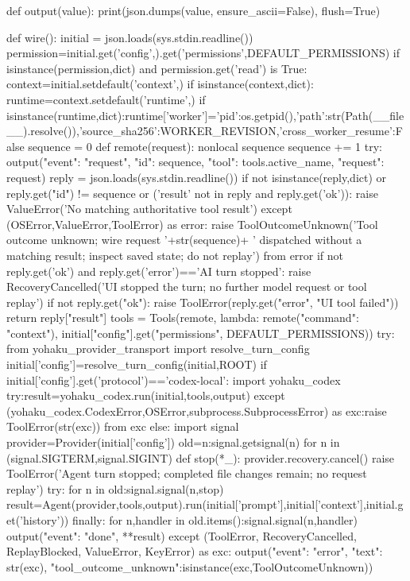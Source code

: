 def output(value):
    print(json.dumps(value, ensure_ascii=False), flush=True)

def wire():
    initial = json.loads(sys.stdin.readline())
    permission=initial.get('config',{}).get('permissions',DEFAULT_PERMISSIONS)
    if isinstance(permission,dict) and permission.get('read') is True:
        context=initial.setdefault('context',{})
        if isinstance(context,dict):
            runtime=context.setdefault('runtime',{})
            if isinstance(runtime,dict):runtime['worker']={'pid':os.getpid(),'path':str(Path(__file__).resolve()),'source_sha256':WORKER_REVISION,'cross_worker_resume':False}
    sequence = 0
    def remote(request):
        nonlocal sequence
        sequence += 1
        try:
            output({"event": "request", "id": sequence, "tool": tools.active_name, "request": request})
            reply = json.loads(sys.stdin.readline())
            if not isinstance(reply,dict) or reply.get("id") != sequence or ('result' not in reply and reply.get('ok')):
                raise ValueError('No matching authoritative tool result')
        except (OSError,ValueError,ToolError) as error:
            raise ToolOutcomeUnknown('Tool outcome unknown; wire request '+str(sequence)+
                ' dispatched without a matching result; inspect saved state; do not replay') from error
        if not reply.get('ok') and reply.get('error')=='AI turn stopped':
            raise RecoveryCancelled('UI stopped the turn; no further model request or tool replay')
        if not reply.get("ok"):
            raise ToolError(reply.get("error", "UI tool failed"))
        return reply["result"]
    tools = Tools(remote, lambda: remote({"command": "context"}), initial["config"].get("permissions", DEFAULT_PERMISSIONS))
    try:
        from yohaku_provider_transport import resolve_turn_config
        initial['config']=resolve_turn_config(initial,ROOT)
        if initial['config'].get('protocol')=='codex-local':
            import yohaku_codex
            try:result=yohaku_codex.run(initial,tools,output)
            except (yohaku_codex.CodexError,OSError,subprocess.SubprocessError) as exc:raise ToolError(str(exc)) from exc
        else:
            import signal
            provider=Provider(initial['config'])
            old={n:signal.getsignal(n) for n in (signal.SIGTERM,signal.SIGINT)}
            def stop(*_):
                provider.recovery.cancel()
                raise ToolError('Agent turn stopped; completed file changes remain; no request replay')
            try:
                for n in old:signal.signal(n,stop)
                result=Agent(provider,tools,output).run(initial['prompt'],initial['context'],initial.get('history'))
            finally:
                for n,handler in old.items():signal.signal(n,handler)
        output({"event": "done", **result})
    except (ToolError, RecoveryCancelled, ReplayBlocked, ValueError, KeyError) as exc:
        output({"event": "error", "text": str(exc), "tool_outcome_unknown":isinstance(exc,ToolOutcomeUnknown)})


